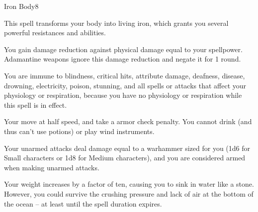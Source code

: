 \begin{spellsection}{Iron Body}{8}
    \begin{spellheader}
    \end{spellheader}
    \begin{spellcontent}
        \begin{spelltargetinginfo}
        \end{spelltargetinginfo}
        \begin{spelleffects}
            \spelleffect This spell transforms your body into living iron, which grants you several powerful resistances and abilities.
            \par You gain damage reduction against physical damage equal to your spellpower. Adamantine weapons ignore this damage reduction and negate it for 1 round.
            \par You are immune to blindness, critical hits, attribute damage, deafness, disease, drowning, electricity, poison, stunning, and all spells or attacks that affect your physiology or respiration, because you have no physiology or respiration while this spell is in effect.
            \par Your move at half speed, and take a  armor check penalty. You cannot drink (and thus can't use potions) or play wind instruments.
            \par Your unarmed attacks deal damage equal to a warhammer sized for you (1d6 for Small characters or 1d8 for Medium characters), and you are considered armed when making unarmed attacks.
            \par Your weight increases by a factor of ten, causing you to sink in water like a stone. However, you could survive the crushing pressure and lack of air at the bottom of the ocean -- at least until the spell duration expires.
            \spelldur \durshort \dismissable
        \end{spelleffects}
    \end{spellcontent}
    \begin{spellfooter}
        \miscastexplode
    \end{spellfooter}
\end{spellsection}

